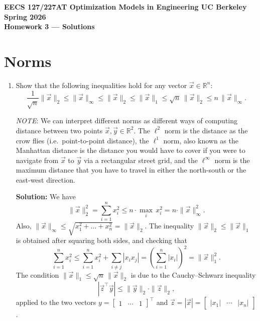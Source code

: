 \documentclass[10pt]{article}
\theoremstyle{definition}
\theoremstyle{plain}
\newcommand{\RR}{\mathbb{R}}
\begin{document}
\begin{center}
{\large\bfseries EECS 127/227AT \quad Optimization Models in Engineering \quad UC Berkeley \quad Spring 2026}\\[6pt]
{\LARGE\bfseries Homework 3 --- Solutions}
\end{center}

\section{Norms}

\begin{enumerate}[label=(\alph*)]
\item Show that the following inequalities hold for any vector $\vec{x} \in \RR^n$:
\begin{equation}
\frac{1}{\sqrt{n}} \|\vec{x}\|_2 \leq \|\vec{x}\|_\infty \leq \|\vec{x}\|_2 \leq \|\vec{x}\|_1 \leq \sqrt{n}\, \|\vec{x}\|_2 \leq n\, \|\vec{x}\|_\infty.
\end{equation}

\textit{NOTE}: We can interpret different norms as different ways of computing distance between two points $\vec{x}, \vec{y} \in \RR^2$. The $\ell^2$ norm is the distance as the crow flies (i.e.\ point-to-point distance), the $\ell^1$ norm, also known as the Manhattan distance is the distance you would have to cover if you were to navigate from $\vec{x}$ to $\vec{y}$ via a rectangular street grid, and the $\ell^\infty$ norm is the maximum distance that you have to travel in either the north-south or the east-west direction.

\textbf{Solution:} We have
\begin{equation}
\|\vec{x}\|_2^2 = \sum_{i=1}^{n} x_i^2 \leq n \cdot \max_i\, x_i^2 = n \cdot \|\vec{x}\|_\infty^2.
\end{equation}
Also, $\|\vec{x}\|_\infty \leq \sqrt{x_1^2 + \ldots + x_n^2} = \|\vec{x}\|_2$. The inequality $\|\vec{x}\|_2 \leq \|\vec{x}\|_1$ is obtained after squaring both sides, and checking that
\begin{equation}
\sum_{i=1}^{n} x_i^2 \leq \sum_{i=1}^{n} x_i^2 + \sum_{i \neq j} |x_i x_j| = \left( \sum_{i=1}^{n} |x_i| \right)^2 = \|\vec{x}\|_1^2.
\end{equation}
The condition $\|\vec{x}\|_1 \leq \sqrt{n}\, \|\vec{x}\|_2$ is due to the Cauchy--Schwarz inequality
\begin{equation}
\left| \vec{z}^\top \vec{y} \right| \leq \|\vec{y}\|_2 \cdot \|\vec{z}\|_2,
\end{equation}
applied to the two vectors $y = \begin{bmatrix} 1 & \cdots & 1 \end{bmatrix}^\top$ and $\vec{z} = |\vec{x}| = \begin{bmatrix} |x_1| & \cdots & |x_n| \end{bmatrix}$.


\end{enumerate}
\end{document}
